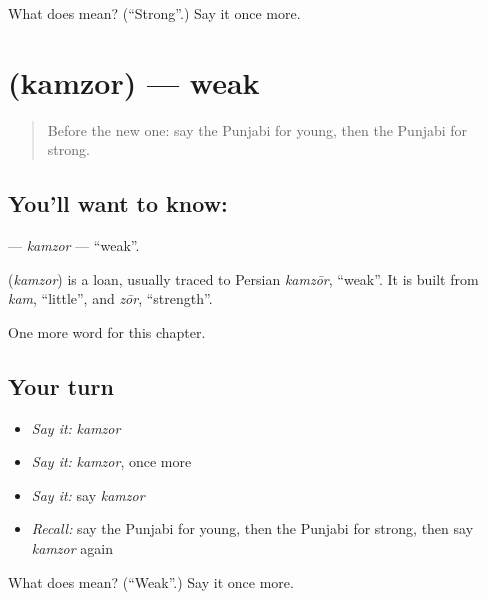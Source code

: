 \begin{tcolorbox}[breakable,colback=teal!4,colframe=teal!35!black,title={Before you move on}]
What does  mean? (\textquotedblleft{}Strong\textquotedblright{}.) Say it once more.
\end{tcolorbox}
\section[\texorpdfstring{\pa{ਕਮਜ਼ੋਰ} (kamzor)}{ਕਮਜ਼ੋਰ (kamzor)}]{ (kamzor) — weak}

\label{lesson:PA-C147-kamzor}



\begin{quote}
Before the new one: say the Punjabi for young, then the Punjabi for strong.
\end{quote}

\subsection*{You'll want to know: }
\textbf{} — \emph{kamzor} — \textquotedblleft{}weak\textquotedblright{}.

\begin{cousinweb}
\textbf{} (\emph{kamzor}) is a loan, usually traced to Persian \emph{kamzōr}, \textquotedblleft{}weak\textquotedblright{}. It is built from \emph{kam}, \textquotedblleft{}little\textquotedblright{}, and \emph{zōr}, \textquotedblleft{}strength\textquotedblright{}.
\end{cousinweb}

\begin{grammarlens}[title={What you've built}]
One more word for this chapter.
\end{grammarlens}

\subsection*{Your turn}
\begin{itemize}
\raggedright
  \item \emph{Say it:} \emph{kamzor}
  \item \emph{Say it:} \emph{kamzor}, once more
  \item \emph{Say it:} say \emph{kamzor}
  \item \emph{Recall:} say the Punjabi for young, then the Punjabi for strong, then say \emph{kamzor} again
\end{itemize}

\begin{tcolorbox}[breakable,colback=teal!4,colframe=teal!35!black,title={Before you move on}]
What does  mean? (\textquotedblleft{}Weak\textquotedblright{}.) Say it once more.
\end{tcolorbox}
